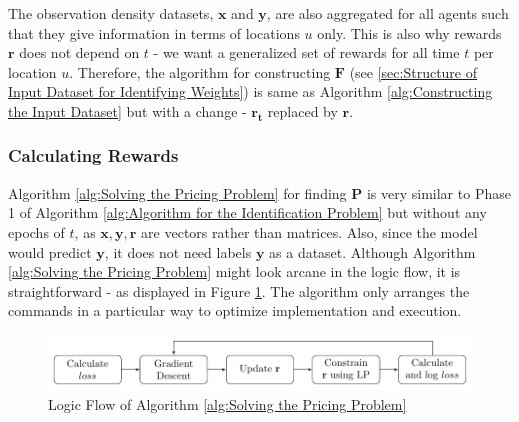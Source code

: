 \documentclass[12pt]{article}
\newcommand{\vect}[1]{\mathbf{#1}}  %
\newcommand{\matr}[1]{\mathbf{#1}}  %
\begin{document}
    The observation density datasets, $\matr{x}$ and $\matr{y}$, are also aggregated for all agents such that they give information in terms of locations $u$ only. This is also why rewards $\vect{r}$ does not depend on $t$ - we want a generalized set of rewards for all time $t$ per location $u$. Therefore, the algorithm for constructing $\matr{F}$ (see \cref{sec:Structure of Input Dataset for Identifying Weights}) is same as Algorithm \ref{alg:Constructing the Input Dataset} but with a change - $\vect{r_t}$ replaced by $\vect{r}$.
    
    \subsubsection{Calculating Rewards} \label{sec:Calculating Rewards}
    Algorithm \ref{alg:Solving the Pricing Problem} for finding $\matr{P}$ is very similar to Phase 1 of Algorithm \ref{alg:Algorithm for the Identification Problem} but without any epochs of $t$, as $\vect{x}, \vect{y}, \vect{r}$ are vectors rather than matrices. Also, since the model would predict $\vect{y}$, it does not need labels $\vect{y}$ as a dataset. Although Algorithm \ref{alg:Solving the Pricing Problem} might look arcane in the logic flow, it is straightforward - as displayed in Figure \ref{fig:Logic Flow of Algorithm Pricing Problem}. The algorithm only arranges the commands in a particular way to optimize implementation and execution.
    \begin{figure}[!htbp]
        \centering
        \includegraphics[width=\textwidth]{logic_alg_pricing}
        \caption{Logic Flow of Algorithm \ref{alg:Solving the Pricing Problem}}
        \label{fig:Logic Flow of Algorithm Pricing Problem}
    \end{figure}
\end{document}
